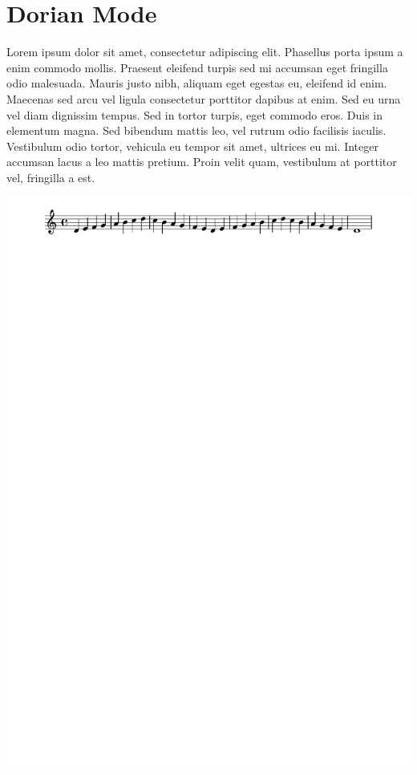 \documentclass[11pt]{article}
\begin{document}
\section*{Dorian Mode}
\label{sec:org8fc1324}

Lorem ipsum dolor sit amet, consectetur adipiscing elit. Phasellus
porta ipsum a enim commodo mollis. Praesent eleifend turpis sed mi
accumsan eget fringilla odio malesuada. Mauris justo nibh, aliquam
eget egestas eu, eleifend id enim. Maecenas sed arcu vel ligula
consectetur porttitor dapibus at enim. Sed eu urna vel diam dignissim
tempus. Sed in tortor turpis, eget commodo eros. Duis in elementum
magna. Sed bibendum mattis leo, vel rutrum odio facilisis iaculis.
Vestibulum odio tortor, vehicula eu tempor sit amet, ultrices eu mi.
Integer accumsan lacus a leo mattis pretium. Proin velit quam,
vestibulum at porttitor vel, fringilla a est.

\begin{center}
\includegraphics[width=.9\linewidth]{dorian.pdf}
\end{center}
\end{document}
